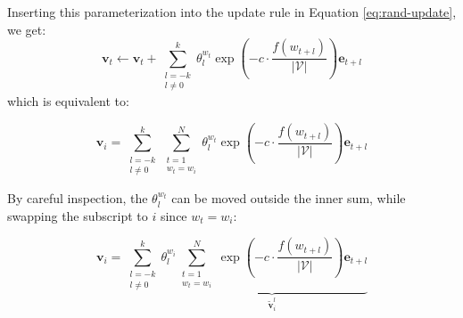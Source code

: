 \documentclass[11pt]{article}
\begin{document}
Inserting this parameterization into the update rule in Equation \eqref{eq:rand-update}, we get:
\begin{equation}
    \label{eq:rand-update-att}
    \textbf{v}_t \leftarrow \textbf{v}_t + \sum_{\substack{l = -k\\l\neq 0}}^{k} \theta_l^{w_t}\exp\left({-c\cdot\frac{f(w_{t+l})}{|\mathcal{V}|}}\right)\textbf{e}_{t+l}
\end{equation}
which is equivalent to:



\begin{equation}\label{eq:context-update}
    \textbf{v}_i = \displaystyle\sum\limits_{\substack{l = -k \\ l \neq 0}}^k\displaystyle\sum\limits_{\substack{t = 1 \\ w_t = w_i}}^N \theta_l^{w_t}\exp\left({-c\cdot\frac{f(w_{t+l})}{|\mathcal{V}|}}\right)\textbf{e}_{t+l}
\end{equation}

By careful inspection, the $\theta_l^{w_t}$ can be moved outside the inner sum, while swapping the subscript to $i$ since $w_t = w_i$:

\begin{equation}\label{equ:att_ri_full}
    \textbf{v}_i = \displaystyle\sum\limits_{\substack{l = -k \\ l \neq 0}}^k\theta_l^{w_i}
    \underbrace{\displaystyle\sum\limits_{\substack{t = 1 \\ w_t = w_i}}^N \exp\left({-c\cdot\frac{f(w_{t+l})}{|\mathcal{V}|}}\right)\textbf{e}_{t+l}}_{\tilde{\textbf{v}}_i^l}
\end{equation}
\end{document}
